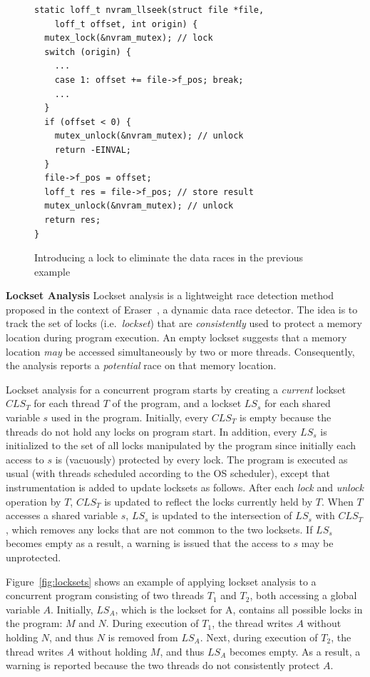 \begin{figure}[t]
\begin{lstlisting}
static loff_t nvram_llseek(struct file *file,
    loff_t offset, int origin) {
  mutex_lock(&nvram_mutex); // lock
  switch (origin) {
    ...
    case 1: offset += file->f_pos; break;
    ...
  }
  if (offset < 0) {
    mutex_unlock(&nvram_mutex); // unlock
    return -EINVAL;
  }
  file->f_pos = offset;
  loff_t res = file->f_pos; // store result
  mutex_unlock(&nvram_mutex); // unlock
  return res;
}
\end{lstlisting}
\caption{Introducing a lock to eliminate the data races in the previous example}
\label{fig:lock_example}
\end{figure}

\noindent\textbf{Lockset Analysis }
%
Lockset analysis is a lightweight race detection method proposed in the context of Eraser~\cite{savage1997eraser}, a dynamic data race detector.  The idea is to track the set of locks (i.e.\ \emph{lockset}) that are \emph{consistently} used to protect a memory location during program execution. An empty lockset suggests that a memory location \emph{may} be accessed simultaneously by two or more threads. Consequently, the analysis reports a \emph{potential} race on that memory location.

Lockset analysis for a concurrent program starts by creating a \emph{current} lockset $\mathit{CLS}_T$ for each thread $T$ of the program, and a lockset $\mathit{LS}_s$ for each shared variable $s$ used in the program. Initially, every $\mathit{CLS}_T$ is empty because the threads do not hold any locks on program start. In addition, every $\mathit{LS}_s$ is initialized to the set of all locks manipulated by the program since initially each access to $s$ is (vacuously) protected by every lock. The program is executed as usual (with threads scheduled according to the OS scheduler), except that instrumentation is added to update locksets as follows.
%
After each \emph{lock} and \emph{unlock} operation by $T$, $\mathit{CLS}_T$ is updated to reflect the locks currently held by $T$.
%
When $T$ accesses a shared variable $s$, $\mathit{LS}_s$ is updated to the intersection of $\mathit{LS}_s$ with $\mathit{CLS}_T$, which removes any locks that are not common to the two locksets.
%
If $\mathit{LS}_s$ becomes empty as a result, a warning is issued that the access to $s$ may be unprotected.

Figure~\ref{fig:locksets} shows an example of applying lockset analysis to a concurrent program consisting of two threads $T_1$ and $T_2$, both accessing a global variable $A$. Initially, $\mathit{LS}_A$, which is the lockset for A, contains all possible locks in the program: $M$ and $N$. During execution of $T_1$, the thread writes $A$ without holding $N$, and thus $N$ is removed from $\mathit{LS}_A$. Next, during execution of $T_2$, the thread writes $A$ without holding $M$, and thus $\mathit{LS}_A$ becomes empty. As a result, a warning is reported because the two threads do not consistently protect $A$.

